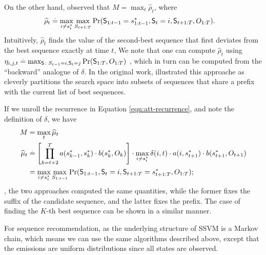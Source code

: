 On the other hand, \citet{nilsson2001sequentially} observed that $M = \max_t \widehat{\rho}_t$, where
\begin{align*}
	\widehat{\rho}_{t} &\stackrel{.}{=} \max_{i \neq s^*_{t}} \max_{S_{t+1:T}} {\Pr( \mathsf{S}_{1:t-1} = s^*_{1:t-1}, \mathsf{S}_t = i, \mathsf{S}_{t+1:T}, O_{1:T} )}.
\end{align*}
Intuitively, $\widehat{\rho}_t$ finds the value of the second-best sequence that first deviates from the best sequence exactly at time $t$,
We note that one can compute $\widehat{\rho}_{t}$ using $\eta_{i, j, t} \stackrel{.}{=} \max_{\mathsf{S} \colon S_{t - 1} = i, \mathsf{S}_{t} = j} \Pr( \mathsf{S}_{1:T}, O_{1:T} )$ \citep{nilsson2001sequentially},
which in turn can be computed from the ``backward'' analogue of $\delta$.
In the original work, \citeauthor{nilsson2001sequentially} illustrated this approache as cleverly partitions the search space into subsets of sequences that share a prefix with the current list of best sequences.

If we unroll the recurrence in Equation \ref{eqn:att-recurrence}, and note the definition of $\delta$, we have
        \begin{align*}
        	M &= \max_t \widehat{\mu}_t \\
        	\widehat{\mu}_{t} &\stackrel{.}{=} \left[ \prod_{k = t+2}^T a( s^*_{k-1}, s^*_{k} ) \cdot b( s^*_{k}, O_{k} ) \right] \cdot \max_{i \neq s^*_{t}} \delta(i, t) \cdot a( i, s^*_{t+1} ) \cdot b( s^*_{t+1}, O_{t+1} ) \\
        	&= \max_{i \neq s^*_{t}} \max_{S_{1:t-1}} {\Pr( \mathsf{S}_{1:t-1}, \mathsf{S}_t = i, \mathsf{S}_{t+1:T} = s^*_{t+1:T}, O_{1:T} )};
        \end{align*}
\ie, the two approaches computed the same quantities, 
while the former fixes the suffix of the candidate sequence, and the latter fixes the prefix. 
The case of finding the $K$-th best sequence can be shown in a similar manner.

For sequence recommendation, as the underlying structure of SSVM is a Markov chain, which means we can use the same algorithms described above, 
except that the emissions are uniform distributions since all states are observed.


